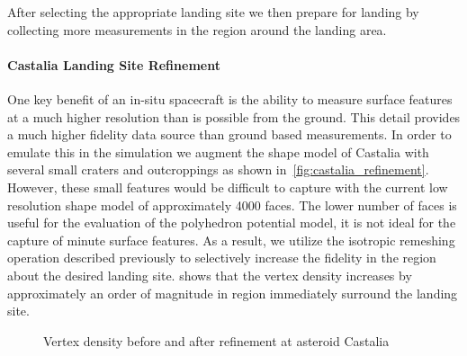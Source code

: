 \documentclass[journal]{new-aiaa}
\begin{document}
After selecting the appropriate landing site we then prepare for landing by collecting more measurements in the region around the landing area.

\paragraph{Castalia Landing Site Refinement}
One key benefit of an in-situ spacecraft is the ability to measure surface features at a much higher resolution than is possible from the ground. 
This detail provides a much higher fidelity data source than ground based measurements. 
In order to emulate this in the simulation we augment the shape model of Castalia with several small craters and outcroppings as shown in~\cref{fig:castalia_refinement}.
However, these small features would be difficult to capture with the current low resolution shape model of approximately \num{4000} faces.
The lower number of faces is useful for the evaluation of the polyhedron potential model, it is not ideal for the capture of minute surface features. 
As a result, we utilize the isotropic remeshing operation described previously to selectively increase the fidelity in the region about the desired landing site.
 shows that the vertex density increases by approximately an order of magnitude in region immediately surround the landing site.
\begin{figure}[htbp]
    \centering
    \caption{Vertex density before and after refinement at asteroid Castalia\label{fig:castalia_refine_density}}
\end{figure}
\end{document}
